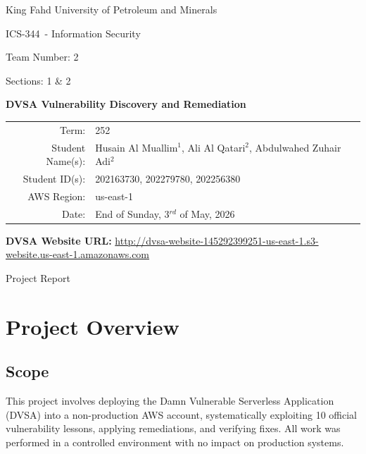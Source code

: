 \documentclass[12pt]{report}
\newcommand{\CourseCode}{ICS-344}
\newcommand{\CourseTitle}{Information Security}
\newcommand{\TeamNo}{2}
\newcommand{\CourseSection}{Sections: 1 \& 2}
\newcommand{\CourseTerm}{252}
\newcommand{\ProjectTitle}{DVSA Vulnerability Discovery and Remediation}
\newcommand{\StudentNames}{Husain Al Muallim$^1$, Ali Al Qatari$^2$, Abdulwahed Zuhair Adi$^2$}
\newcommand{\StudentIDs}{202163730, 202279780, 202256380}
\newcommand{\DVSAWebsiteURL}{http://dvsa-website-145292399251-us-east-1.s3-website.us-east-1.amazonaws.com}
\newcommand{\AWSRegion}{us-east-1}
\newcommand{\SubmissionDate}{End of Sunday, 3$^{rd}$ of May, 2026}
\begin{document}
\hypersetup{pageanchor=false}
\begin{titlepage}
  \centering
  {\Large King Fahd University of Petroleum and Minerals\par}
  \vspace{1.2cm}
  {\Large \CourseCode\ - \CourseTitle\par}
  {\large Team Number: \TeamNo\par}
  {\large \CourseSection\par}
  \vspace{1.4cm}
  {\huge \bfseries \ProjectTitle\par}
  \vspace{1.4cm}

  \begin{tabularx}{\textwidth}{@{}rY@{}}
    Term: & \CourseTerm \\
    Student Name(s): & \StudentNames \\
    Student ID(s): & \StudentIDs \\
    AWS Region: & \AWSRegion \\
    Date: & \SubmissionDate \\
  \end{tabularx}

  \vspace{0.6cm}
  {\small\textbf{DVSA Website URL:} \url{\DVSAWebsiteURL}\par}

  \vfill
  {\large Project Report\par}
\end{titlepage}

\clearpage
\hypersetup{pageanchor=true}
\tableofcontents
\clearpage

\chapter*{Project Overview}

\section*{Scope}
This project involves deploying the Damn Vulnerable Serverless Application (DVSA) into a non-production AWS account, systematically exploiting 10 official vulnerability lessons, applying remediations, and verifying fixes. All work was performed in a controlled environment with no impact on production systems.
\end{document}
